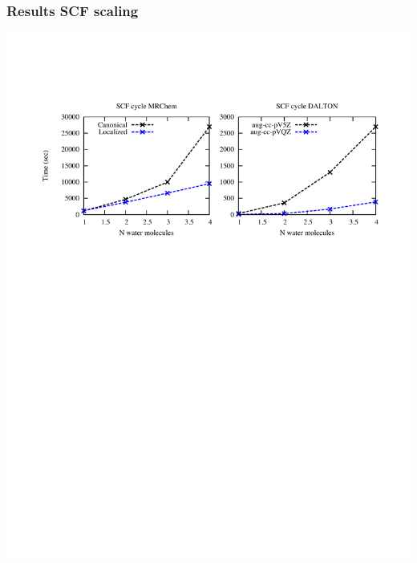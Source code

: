 \documentclass[mathserif]{beamer}
\begin{document}
\begin{frame}
    \frametitle{Results SCF scaling}
    \begin{center}
    \includegraphics[bb = 50 480 600 700, clip, scale=0.6]{figures/SCFscaling_2.pdf}
    \end{center}
\end{frame}
\end{document}
